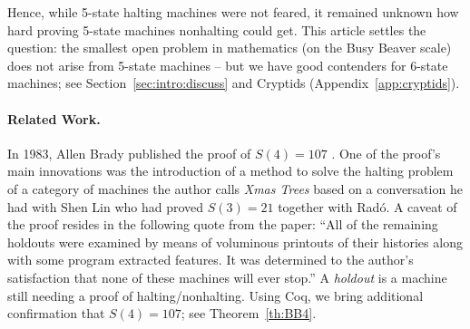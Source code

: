 \documentclass[a4paper,british]{article}
\theoremstyle{definition} %
\numberwithin{equation}{section}
\theoremstyle{definition} %
\newcommand{\ts}[1]{{\color{red}#1}}
\newcommand{\BBtheFourth}{107}
\newcommand{\rado}{Rad\'o\xspace}
\begin{document}
Hence, while 5-state halting machines were not feared, it remained unknown how hard proving 5-state machines nonhalting could get. This article settles the question: the smallest open problem in mathematics (on the Busy Beaver scale) does not arise from 5-state machines -- but we have good contenders for 6-state machines; see Section~\ref{sec:intro:discuss} and Cryptids (Appendix~\ref{app:cryptids}).

\paragraph{Related Work.} In 1983, Allen Brady published the proof of $S(4) = \BBtheFourth$ \cite{Brady83}. One of the proof's main innovations was the introduction of a method to solve the halting problem of a category of machines the author calls \textit{Xmas Trees} based on a conversation he had with Shen Lin who had proved $S(3) = 21$ together with \rado. A caveat of the proof resides in the following quote from the paper: ``All of the remaining holdouts were examined by means of voluminous printouts of their histories along with some program extracted features. It was determined to the author's satisfaction that none of these machines will ever stop.'' A \textit{holdout} is a machine still needing a proof of halting/nonhalting. Using Coq, we bring additional confirmation that $S(4) = \BBtheFourth$; see Theorem~\ref{th:BB4}.

\newcommand{\SkeletHoldoutsSporadic}{\ts{XX}\xspace}
\end{document}
